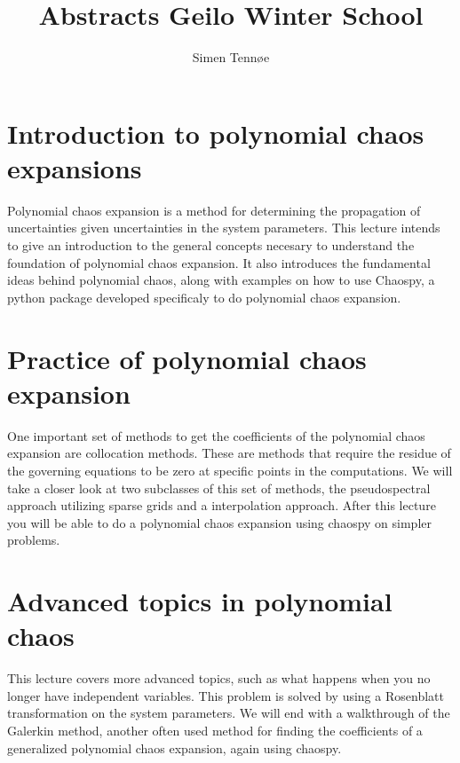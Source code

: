\documentclass[a4paper,10pt]{article}
\title{Abstracts Geilo Winter School}
\author{Simen Tennøe}
\begin{document}
\maketitle
\newpage


\section{Introduction to polynomial chaos expansions}
Polynomial chaos expansion is a method for determining the propagation of uncertainties given uncertainties in the system parameters. This lecture intends to give an introduction to the general concepts necesary to understand the foundation of polynomial chaos expansion. It also introduces the fundamental ideas behind polynomial chaos, along with examples on how to use Chaospy, a python package developed specificaly to do polynomial chaos expansion.




\section{Practice of polynomial chaos expansion}
One important set of methods to get the coefficients of the polynomial chaos expansion are collocation methods. These are methods that require the residue of the governing equations to be zero at specific points in the computations. We will take a closer look at two subclasses of this set of methods, the pseudospectral approach utilizing sparse grids and a interpolation approach.
After this lecture you will be able to do a polynomial chaos expansion using chaospy on simpler problems.




\section{Advanced topics in polynomial chaos}
This lecture covers more advanced topics, such as what happens when you no longer have independent variables. This problem is solved by using a Rosenblatt transformation on the system parameters. %
We will end with a walkthrough of the Galerkin method, another often used method for finding the coefficients of a generalized polynomial chaos expansion, again using chaospy.
\end{document}
